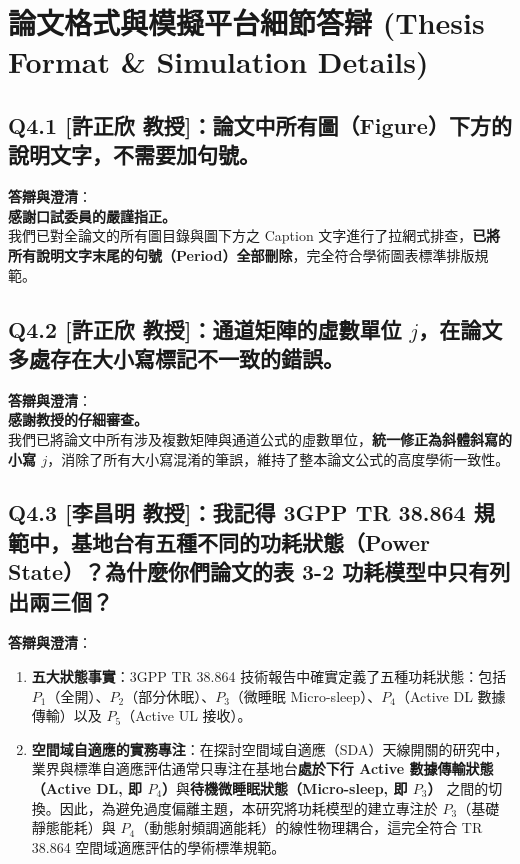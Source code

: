 \section{論文格式與模擬平台細節答辯 (Thesis Format \& Simulation Details)}

\subsection*{Q4.1 [許正欣 教授]：論文中所有圖（Figure）下方的說明文字，不需要加句號。}
\textbf{答辯與澄清}：\\
\textbf{感謝口試委員的嚴謹指正。}\\
我們已對全論文的所有圖目錄與圖下方之 Caption 文字進行了拉網式排查，\textbf{已將所有說明文字末尾的句號（Period）全部刪除}，完全符合學術圖表標準排版規範。

\subsection*{Q4.2 [許正欣 教授]：通道矩陣的虛數單位 $j$，在論文多處存在大小寫標記不一致的錯誤。}
\textbf{答辯與澄清}：\\
\textbf{感謝教授的仔細審查。}\\
我們已將論文中所有涉及複數矩陣與通道公式的虛數單位，\textbf{統一修正為斜體斜寫的小寫 $j$}，消除了所有大小寫混淆的筆誤，維持了整本論文公式的高度學術一致性。

\subsection*{Q4.3 [李昌明 教授]：我記得 3GPP TR 38.864 規範中，基地台有五種不同的功耗狀態（Power State）？為什麼你們論文的表 3-2 功耗模型中只有列出兩三個？}
\textbf{答辯與澄清}：\\
\begin{enumerate}
    \item \textbf{五大狀態事實}：3GPP TR 38.864 技術報告中確實定義了五種功耗狀態：包括 $P_1$（全開）、$P_2$（部分休眠）、$P_3$（微睡眠 Micro-sleep）、$P_4$（Active DL 數據傳輸）以及 $P_5$（Active UL 接收）。
    \item \textbf{空間域自適應的實務專注}：在探討空間域自適應（SDA）天線開關的研究中，業界與標準自適應評估通常只專注在基地台\textbf{處於下行 Active 數據傳輸狀態（Active DL, 即 $P_4$）}與\textbf{待機微睡眠狀態（Micro-sleep, 即 $P_3$）} 之間的切換。因此，為避免過度偏離主題，本研究將功耗模型的建立專注於 $P_3$（基礎靜態能耗）與 $P_4$（動態射頻調適能耗）的線性物理耦合，這完全符合 TR 38.864 空間域適應評估的學術標準規範。
\end{enumerate}